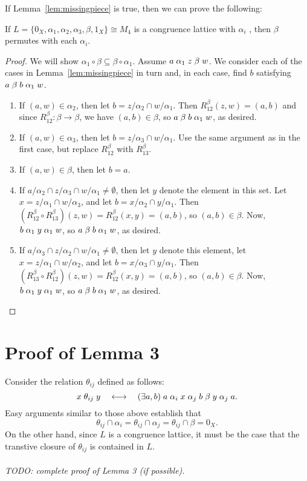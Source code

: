 If Lemma~\ref{lem:missingpiece} is true, then we can prove the following:
\begin{theorem}
If $L = \{0_X, \alpha_1, \alpha_2, \alpha_3, \beta, 1_X\} \cong  M_4$ is a
congruence lattice with $\alpha_i$ \pppc, then $\beta$ permutes with each $\alpha_i$.
\end{theorem}
\begin{proof}
We will show $\alpha_1 \circ \beta \subseteq \beta \circ \alpha_1$.
Assume $a \mathrel{\alpha}_1 z \mathrel{\beta} w$.  We consider each of the cases in
Lemma~\ref{lem:missingpiece} in turn and,
in each case, find $b$ satisfying $a \mathrel{\beta} b \mathrel{\alpha}_1 w$.
\begin{enumerate}
\item If $(a,w) \in \alpha_2$, then let $b = z/\alpha_2 \cap w/\alpha_1$.  Then
$R^\beta_{12}(z,w) = (a,b)$ and since 
$R^\beta_{12}: \beta \rightarrow \beta$, we have $(a,b) \in \beta$, so 
$a \mathrel{\beta} b \mathrel{\alpha}_1 w$, as desired.  
\item If $(a,w) \in \alpha_3$, then let $b = z/\alpha_3 \cap w/\alpha_1$. Use the same
argument as in the first case, but replace $R^\beta_{12}$ with $R^\beta_{13}$. 
\item If $(a,w) \in \beta$, then let $b = a$. 
\item If  $a/\alpha_2 \cap z/\alpha_3 \cap w/\alpha_1 \neq \emptyset$, then let
  $y$ denote the element in this set.  Let $x = z/\alpha_1 \cap w/\alpha_3$, and
  let $b = x/\alpha_2\cap y/\alpha_1$.  
  Then $(R^\beta_{12}\circ R^\beta_{13})(z,w) = R^\beta_{12}(x,y) = (a,b)$, so $(a,b) \in \beta$.
  Now, $b\mathrel{\alpha}_1 y \mathrel{\alpha}_1 w$, so
  $a \mathrel{\beta} b \mathrel{\alpha}_1 w$, as desired.
\item If $a/\alpha_3 \cap z/\alpha_2 \cap w/\alpha_1 \neq \emptyset$, then let 
  $y$ denote this element, let $x = z/\alpha_1 \cap w/\alpha_2$, and
  let $b = x/\alpha_3\cap y/\alpha_1$.  
  Then $(R^\beta_{13}\circ R^\beta_{12})(z,w) = R^\beta_{12}(x,y) = (a,b)$, so $(a,b) \in \beta$.
  Now, $b\mathrel{\alpha}_1 y \mathrel{\alpha}_1 w$, so $a \mathrel{\beta} b \mathrel{\alpha}_1 w$, as desired.
\end{enumerate}
\end{proof}

\section{Proof of Lemma 3}
Consider the relation $\theta_{ij}$ defined as follows:
\[
x \mathrel{\theta}_{ij} y \quad \longleftrightarrow \quad (\exists a, b) \;
a \mathrel{\alpha}_i x \mathrel{\alpha}_j b \mathrel{\beta} y \mathrel{\alpha}_j a.
\]
Easy arguments similar to those above establish that 
\[
\theta_{ij} \cap \alpha_i = \theta_{ij} \cap \alpha_j =
\theta_{ij} \cap \beta = 0_X.\]
On the other hand, since $L$ is a congruence lattice, it must be the case that
the transtive closure of $\theta_{ij}$ is contained in $L$.\\
\\
{\it TODO: complete proof of Lemma 3 (if possible).}

